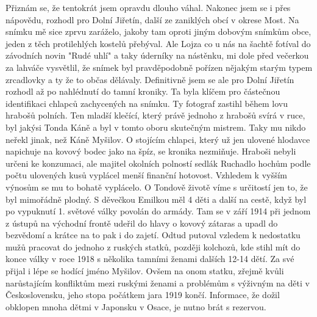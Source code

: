 
Přiznám se, že tentokrát jsem opravdu dlouho váhal. Nakonec jsem se i
přes nápovědu, rozhodl pro Dolní Jiřetín, další ze zaniklých obcí v
okrese Most. Na snímku mě sice zprvu zaráželo, jakoby tam oproti jiným
dobovým snímkům obce, jeden z těch protilehlých kostelů přebýval. Ale
Lojza co u nás na šachtě fotíval do závodních novin "Rudé uhlí" a taky
úderníky na nástěnku, mi dole před večerkou za lahváče vysvětlil, že
snímek byl pravděpodobně pořízen nějakým starým typem zrcadlovky a ty
že to občas dělávaly. Definitivně jsem se ale pro Dolní Jiřetín
rozhodl až po nahlédnutí do tamní kroniky. Ta byla klíčem pro
částečnou identifikaci chlapců zachycených na snímku. Ty fotograf
zastihl během lovu hrabošů polních. Ten mladší klečící, který právě
jednoho z hrabošů svírá v ruce, byl jakýsi Tonda Káně a byl v tomto
oboru skutečným mistrem. Taky mu nikdo neřekl jinak, než Káně Myšilov.
O stojícím chlapci, který už jen ulovené hlodavce napichuje na kovový
bodec jako na špíz, se kronika nezmiňuje. Hraboši nebyli určeni ke
konzumaci, ale majitel okolních polností sedlák Ruchadlo hochům podle
počtu ulovených kusů vyplácel menší finanční hotovost. Vzhledem k
vyšším výnosům se mu to bohatě vyplácelo. O Tondově životě víme s
určitostí jen to, že byl mimořádně plodný. S děvečkou Emilkou měl 4
děti a další na cestě, když byl po vypuknutí 1. světové války povolán
do armády. Tam se v září 1914 při jednom z ústupů na východní frontě
    udeřil do hlavy o kovový zátaras a upadl do bezvědomí a krátce na
    to pak i do zajetí. Odtud putoval vzledem k nedostatku mužů
    pracovat do jednoho z ruských statků, později kolchozů, kde stihl
    mít do konce války v roce 1918 s několika tamními ženami dalších
    12-14 dětí. Za své přijal i lépe se hodící jméno Myšilov. Ovšem na
    onom statku, zřejmě kvůli narůstajícím konfliktům mezi ruskými
    ženami a problémům s výživným na děti v Československu, jeho stopa
    počátkem jara 1919 končí. Informace, že dožil obklopen mnoha dětmi
    v Japonsku v Osace, je nutno brát s rezervou.

